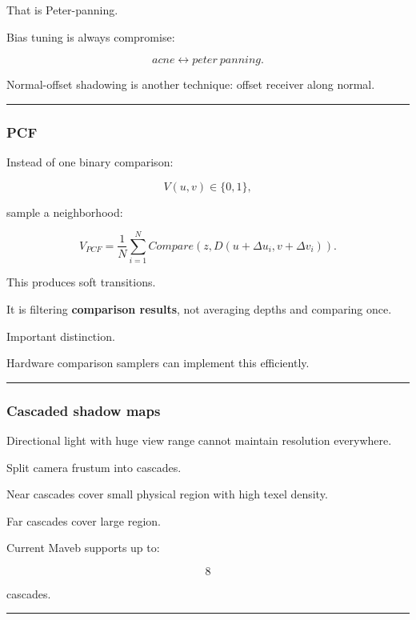 That is Peter-panning.

Bias tuning is always compromise:

\[
acne
\leftrightarrow
peter\ panning.
\]

Normal-offset shadowing is another technique: offset receiver along normal.

\begin{center}\rule{0.5\linewidth}{0.5pt}\end{center}

\subsubsection{PCF}\label{pcf}

Instead of one binary comparison:

\[
V(u,v)\in\{0,1\},
\]

sample a neighborhood:

\[
\boxed{
V_{PCF}
=
\frac1N
\sum_{i=1}^{N}
Compare(
z,
D(u+\Delta u_i,v+\Delta v_i)
).
}
\]

This produces soft transitions.

It is filtering \textbf{comparison results}, not averaging depths and comparing once.

Important distinction.

Hardware comparison samplers can implement this efficiently.

\begin{center}\rule{0.5\linewidth}{0.5pt}\end{center}

\subsubsection{Cascaded shadow maps}\label{cascaded-shadow-maps}

Directional light with huge view range cannot maintain resolution everywhere.

Split camera frustum into cascades.

Near cascades cover small physical region with high texel density.

Far cascades cover large region.

Current Maveb supports up to:

\[
8
\]

cascades.

\begin{center}\rule{0.5\linewidth}{0.5pt}\end{center}

